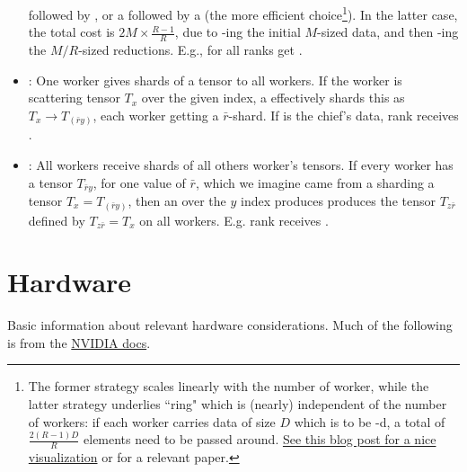 \begin{itemize}
	       followed by , or a  followed
	      by a  (the more efficient choice\footnote{The former strategy scales
		      linearly with the number of worker, while the latter strategy underlies ``ring"
		       which is (nearly) independent of the number of workers: if each
		      worker carries data of size $ D $ which is to be -d, a total of $
			      \frac{ 2 \left ( R-1 \right )D }{ R } $ elements need to be passed around.
		      \href{https://andrew.gibiansky.com/blog/machine-learning/baidu-allreduce/}{See this blog
			      post for a nice visualization} or \cite{bandwidthOptimalAllReduce2009} for a relevant
              paper.\label{foot_all_reduce}}). In the latter case, the total cost is $ 2M \times
              \frac{ R-1 }{ R } $, due to -ing the initial $ M $-sized data, and
              then -ing the $ M/R $-sized reductions. E.g., for 
              all ranks get .
      \item  {}: One worker gives shards of a tensor to all workers. If the worker
          is scattering tensor $ T _{ x } $ over the given index, a 
          effectively shards this as $ T _{ x } \longrightarrow T _{ (\bar{r}y) } $, each worker
          getting a $ \bar{r} $-shard. If  is the chief's data, rank 
          receives .
      \item  {}: All workers receive shards of all others worker's tensors.  If
          every worker has a tensor $ T _{ \bar{r}y } $, for one value of $ \bar{r} $, which we
          imagine came from a sharding a tensor $ T _{ x } = T _{ (\bar{r}y) } $, then an
           over the $ y $ index produces produces the tensor $ T _{ z \bar{r} }$
          defined by $T _{ z \bar{r} }= T _{ x } $ on all workers. E.g. rank  receives
          .
\end{itemize}



\section{Hardware}

Basic information about relevant hardware considerations. Much of the following is from the
\href{https://docs.nvidia.com/deeplearning/performance/dl-performance-gpu-background/index.html}{NVIDIA
	docs}.



